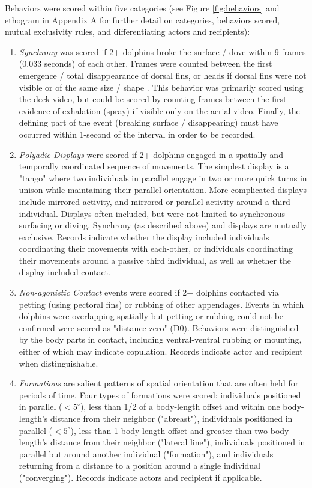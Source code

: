 \documentclass[11pt]{amsart}
\begin{document}
Behaviors were scored within five categories (see Figure \ref{fig:behaviors} and ethogram in Appendix A for further detail on categories, behaviors scored, mutual exclusivity rules, and differentiating actors and recipients):
\begin{enumerate}
\item{\emph{Synchrony}} was scored if 2+ dolphins broke the surface / dove within 9 frames (0.033 seconds) of each other. Frames were counted between the first emergence / total disappearance of dorsal fins, or heads if dorsal fins were not visible or of the same size / shape \citep{connor:2006}. This behavior was primarily scored using the deck video, but could be scored by counting frames between the first evidence of exhalation (spray) if visible only on the aerial video. Finally, the defining part of the event (breaking surface / disappearing) must have occurred within 1-second of the interval in order to be recorded. 
\item{\emph{Polyadic Displays}} were scored if 2+ dolphins engaged in a spatially and temporally coordinated sequence of movements. The simplest display is a "tango" where two individuals in parallel engage in two or more quick turns in unison while maintaining their parallel orientation. More complicated displays include mirrored activity, and mirrored or parallel activity around a third individual. Displays often included, but were not limited to synchronous surfacing or diving. Synchrony (as described above) and displays are mutually exclusive. Records indicate whether the display included individuals coordinating their movements with each-other, or individuals coordinating their movements around a passive third individual, as well as whether the display included contact.
\item{\emph{Non-agonistic Contact}} events were scored if 2+ dolphins contacted via petting (using pectoral fins) or rubbing of other appendages. Events in which dolphins were overlapping spatially but petting or rubbing could not be confirmed were scored as "distance-zero" (D0). Behaviors were distinguished by the body parts in contact, including ventral-ventral rubbing or mounting, either of which may indicate copulation. Records indicate actor and recipient when distinguishable.
\item{\emph{Formations}} are salient patterns of spatial orientation that are often held for periods of time. Four types of formations were scored: individuals positioned in parallel ($<5^{\circ}$), less than 1/2 of a body-length offset and within one body-length's distance from their neighbor ("abreast"), individuals positioned in parallel ($<5^{\circ}$), less than 1 body-length offset and greater than two body-length's distance from their neighbor ("lateral line"), individuals positioned in parallel but around another individual ("formation"), and individuals returning from a distance to a position around a single individual ("converging"). Records indicate actors and recipient if applicable.

\end{enumerate}
\end{document}
